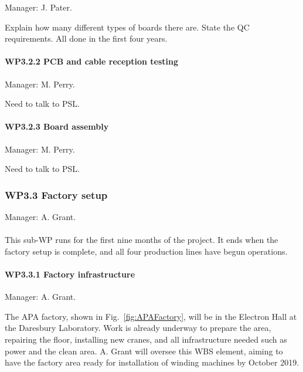 Manager: J. Pater.

Explain how many different types of boards there are.
State the QC requirements.
All done in the first four years.

\paragraph{WP3.2.2 PCB and cable reception testing}

Manager: M. Perry.

Need to talk to PSL.

\paragraph{WP3.2.3 Board assembly}

Manager: M. Perry.

Need to talk to PSL.

\subsubsection{WP3.3 Factory setup}
Manager: A. Grant.\\
\\ This sub-WP runs for the first nine months of the project. It ends when the factory setup is complete, and all four production lines have begun operations.

\paragraph{WP3.3.1 Factory infrastructure} Manager: A. Grant.

The APA factory, shown in Fig.~\ref{fig:APAFactory}, will be in the Electron Hall at the Daresbury Laboratory. Work is already underway to prepare the area, repairing the floor, installing new cranes, and all infrastructure needed such as power and the clean area. A. Grant will oversee this WBS element, aiming to have the factory area ready for installation of winding machines by October 2019.

